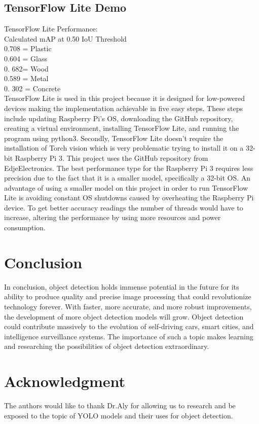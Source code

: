 \documentclass[conference]{IEEEtran}
\begin{document}
\subsection{TensorFlow Lite Demo}

TensorFlow Lite Performance:\\
Calculated mAP at 0.50 IoU Threshold\\
0.708 = Plastic\\
0.604 = Glass\\
0. 682= Wood\\
0.589 = Metal\\ 
0. 302 = Concrete\\

TensorFlow Lite is used in this project because it is designed for low-powered devices making the implementation achievable in five easy steps. These steps include updating Raspberry Pi's OS, downloading the GitHub repository, creating a virtual environment, installing TensorFlow Lite, and running the program using python3. Secondly, TensorFlow Lite doesn't require the installation of Torch vision which is very problematic trying to install it on a 32-bit Raspberry Pi 3. This project uses the GitHub repository from EdjeElectronics. The best performance type for the Raspberry Pi 3 requires less precision due to the fact that it is a smaller model, specifically a 32-bit OS. An advantage of using a smaller model on this project in order to run TensorFlow Lite is avoiding constant OS shutdowns caused by overheating the Raspberry Pi device. To get better accuracy readings the number of threads would have to increase, altering the performance by using more resources and power consumption.

\section{Conclusion}
In conclusion, object detection holds immense potential in the future for its ability to produce quality and precise image processing that could revolutionize technology forever. With faster, more accurate, and more robust improvements, the development of more object detection models will grow. Object detection could contribute massively to the evolution of self-driving cars, smart cities, and intelligence surveillance systems.\cite{Kanjee_2023} The importance of such a topic makes learning and researching the possibilities of object detection extraordinary.    
 
\section*{Acknowledgment}

The authors would like to thank Dr.Aly for allowing us to research and be exposed to the topic of YOLO models and their uses for object detection. 


\cite{Jocher_2023}  
\cite{Arie_2022} 
\cite{Lee_2021}
\cite{EdjeElectronics}


\end{document}
